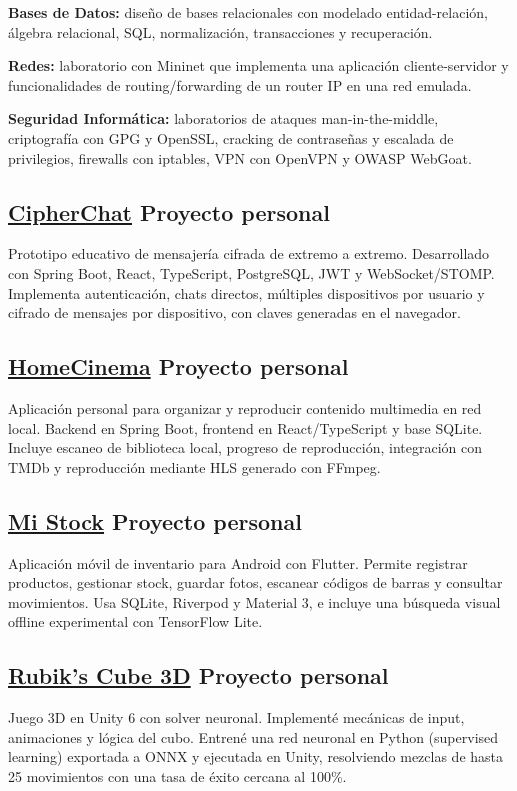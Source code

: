 \documentclass[letter,10pt]{article}
\begin{document}
\textbf{Bases de Datos:} diseño de bases relacionales con modelado entidad-relación, álgebra relacional, SQL, normalización, transacciones y recuperación.

\textbf{Redes:} laboratorio con Mininet que implementa una aplicación cliente-servidor y funcionalidades de routing/forwarding de un router IP en una red emulada.

\textbf{Seguridad Informática:} laboratorios de ataques man-in-the-middle, criptografía con GPG y OpenSSL, cracking de contraseñas y escalada de privilegios, firewalls con iptables, VPN con OpenVPN y OWASP WebGoat.

\vspace{5mm}

\subsection{{\href{https://github.com/FacundoBacigalupi/cipher-chat}{CipherChat} \hfill Proyecto personal}}
Prototipo educativo de mensajería cifrada de extremo a extremo. Desarrollado con Spring Boot, React, TypeScript, PostgreSQL, JWT y WebSocket/STOMP. Implementa autenticación, chats directos, múltiples dispositivos por usuario y cifrado de mensajes por dispositivo, con claves generadas en el navegador.

\vspace{5mm}

\subsection{{\href{https://github.com/FacundoBacigalupi/home-cinema}{HomeCinema} \hfill Proyecto personal}}
Aplicación personal para organizar y reproducir contenido multimedia en red local. Backend en Spring Boot, frontend en React/TypeScript y base SQLite. Incluye escaneo de biblioteca local, progreso de reproducción, integración con TMDb y reproducción mediante HLS generado con FFmpeg.

\vspace{5mm}

\subsection{{\href{https://github.com/FacundoBacigalupi/my-stock}{Mi Stock} \hfill Proyecto personal}}
Aplicación móvil de inventario para Android con Flutter. Permite registrar productos, gestionar stock, guardar fotos, escanear códigos de barras y consultar movimientos. Usa SQLite, Riverpod y Material 3, e incluye una búsqueda visual offline experimental con TensorFlow Lite.

\vspace{5mm}

\subsection{{\href{https://github.com/FacundoBacigalupi/rubkis-cube}{Rubik's Cube 3D} \hfill Proyecto personal}}
Juego 3D en Unity 6 con solver neuronal. Implementé mecánicas de input, animaciones y lógica del cubo. Entrené una red neuronal en Python (supervised learning) exportada a ONNX y ejecutada en Unity, resolviendo mezclas de hasta 25 movimientos con una tasa de éxito cercana al 100\%.
\end{document}
